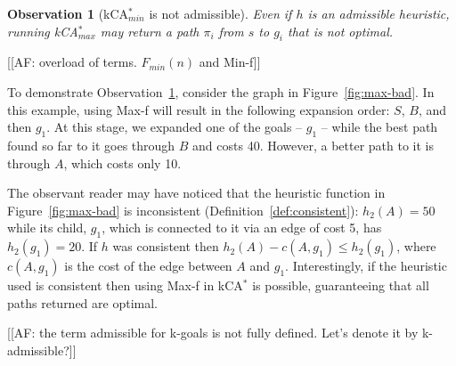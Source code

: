 \documentclass{aicom2e}
\newtheorem{observation}{Observation}
\newcommand{\kastar}{kCA$^*$}
\newcommand{\kastarmin}{kCA$^*_{min}$}
\newcommand{\kastarmax}{kCA$^*_{max}$}
\newcommand{\minf}{Min-f}
\newcommand{\maxf}{Max-f}
\begin{document}
 \begin{observation}[\kastarmin{} is not admissible]
    Even if $h$ is an admissible heuristic,
    running \kastarmax{} may return a path $\pi_i$ from $s$ to $g_i$ that is not optimal.
    \label{obs:max-f-inadmissible}
 \end{observation}

[[AF: overload of terms. $F_{min}(n)$ and \minf{}]]

To demonstrate Observation~\ref{obs:max-f-inadmissible}, consider the graph in
Figure~\ref{fig:max-bad}. In this example, using \maxf{} will result in the
following expansion order: $S$, $B$, and then $g_1$. At this stage, we expanded
one of the goals -- $g_1$ -- while the best path found so far to it goes
through $B$ and costs 40. However, a better path to it is through $A$, which
costs only 10.


The observant reader may have noticed that the heuristic function in
Figure~\ref{fig:max-bad} is inconsistent (Definition~\ref{def:consistent}):
$h_2(A)=50$ while its child, $g_1$, which is connected to it via an edge of
cost 5, has $h_2(g_1)=20$. If $h$ was consistent then $h_2(A)-c(A,g_1)\leq
h_2(g_1)$, where $c(A,g_1)$ is the cost of the edge between $A$ and $g_1$.
Interestingly, if the heuristic used is consistent then using \maxf{} in \kastar{} is possible,
guaranteeing that all paths returned are optimal. %

[[AF: the term admissible for k-goals is not fully defined. Let's denote it by
k-admissible?]]
\end{document}
